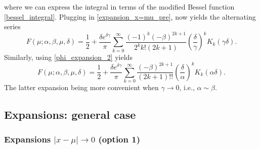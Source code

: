 \documentclass[10pt,a4paper,oneside]{article}
\numberwithin{equation}{section}
\begin{document}
where we can express the integral in terms of the modified Bessel function \eqref{bessel_integral}. Plugging in \eqref{expansion_x=mu_pre}, now yields the alternating series
\begin{equation}\label{series_x=mu_1}
F(\mu; \alpha, \beta, \mu, \delta) = \frac{1}{2} + \frac{\delta e^{\delta \gamma}}{\pi} \sum_{k=0}^{\infty} \frac{(-1)^k (-\beta)^{2k+1}}{2^k k! (2k + 1)} \left(\frac{\delta}{\gamma}\right)^k K_k(\gamma \delta).
\end{equation}
Similarly, using \eqref{phi_expansion_2} yields
\begin{equation}\label{series_x=mu_2}
F(\mu; \alpha, \beta, \mu, \delta) = \frac{1}{2} + \frac{\delta e^{\delta \gamma}}{\pi} \sum_{k=0}^{\infty} \frac{(-\beta)^{2k+1}}{(2k + 1)!!} \left(\frac{\delta}{\alpha}\right)^k K_k(\alpha \delta).
\end{equation}
The latter expansion being more convenient when $\gamma \to 0$, i.e., $\alpha \sim \beta$.



\subsection{Expansions: general case}
\subsubsection{Expansions $|x-\mu| \to 0$ (option 1)}
\end{document}
